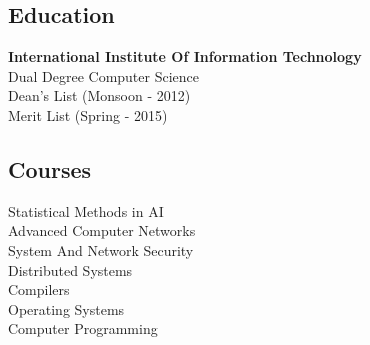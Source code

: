 \documentclass[letterpaper]{deedy-resume} %
\begin{document}
\begin{minipage}[t]{0.31\textwidth}
\subsection{Education} 
\textbf{International Institute Of Information Technology}\\
\textbullet{}Dual Degree Computer Science \\
\textbullet{}Dean's List (Monsoon - 2012) \\
\textbullet{}Merit List (Spring - 2015) \\
\sectionspace %

\subsection{Courses}
\textbullet{}Statistical Methods in AI \\
\textbullet{}Advanced Computer Networks \\
\textbullet{}System And Network Security \\
\textbullet{}Distributed Systems \\
\textbullet{}Compilers \\
\textbullet{}Operating Systems \\
\textbullet{}Computer Programming \\
\sectionspace %

\end{minipage} %
\hfill
%
%
\end{document}
